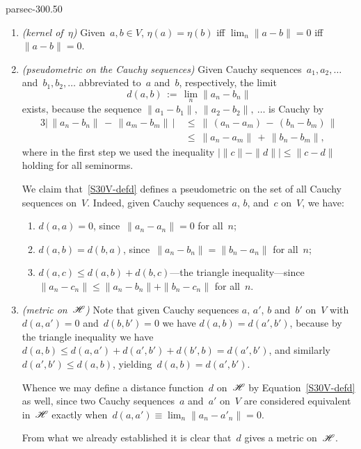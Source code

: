 \documentclass[b5page]{book}
\begin{document}
\begin{solution}{parsec-300.50}
\begin{enumerate}
\item
\emph{(kernel of~$\eta$)}
Given~$a,b\in V$,
 $\eta(a)=\eta(b)$
iff $\lim_n \|a-b\|=0$
iff $\|a-b\|=0$.
\item
\emph{(pseudometric on the Cauchy sequences)}
Given Cauchy sequences~$a_1,a_2,\dotsc$ and~$b_1,b_2,\dotsc$
abbreviated to~$a$ and~$b$, respectively,
the limit 
\begin{equation}
\label{S30V-defd}
\textstyle d(a,b)\,:=\,\lim_n \|a_n-b_n\|
\end{equation}
exists,
because the sequence  $\|a_1-b_1\|,\ \|a_2-b_2\|,\ \dotsc$
is Cauchy by
\begin{alignat*}{3}
\left|\,\|a_n-b_n\|\,-\,\|a_m-b_m\|\,\right|
\ &\leq\ 
\|\,(a_n-a_m)\,-\,(b_n-b_m)\,\|\\
\ &\leq\ \|a_n-a_m\|\,+\,\|b_n-b_m\|,
\end{alignat*}
where in the first step
we used the inequality  $\left|\|c\|-\|d\|\right|\leq \|c-d\|$
holding for all seminorms.

We claim that~\eqref{S30V-defd} defines
a pseudometric on the set of all Cauchy sequences on~$V$.
Indeed, given Cauchy sequences $a$, $b$, and~$c$ on~$V$,
we have:
\begin{enumerate}
\item
$d(a,a)=0$, since~$\|a_n-a_n\|=0$ for all~$n$;
\item
$d(a,b)=d(b,a)$, since~$\|a_n-b_n\|=\|b_n-a_n\|$
for all~$n$;
\item
$d(a,c)\leq d(a,b)+d(b,c)$---the triangle inequality---since
$\|a_n-c_n\|\leq \|a_n-b_n\|+\|b_n-c_n\|$
for all~$n$.
\end{enumerate}
\item\emph{(metric on~$\mathscr{H}$)}\label{S40Vmetric}
Note that given Cauchy sequences $a$, $a'$, $b$ and~$b'$ on~$V$
with $d(a,a')=0$ and~$d(b,b')=0$
we have $d(a,b)=d(a',b')$,
because by the triangle inequality
we have
$d(a,b) \leq d(a,a')+d(a',b')+d(b',b)
= d(a',b')$, and similarly $d(a',b')\leq d(a,b)$,
yielding~$d(a,b)=d(a',b')$.

Whence we may define a distance function~$d$ 
on~$\mathscr{H}$ by Equation~\eqref{S30V-defd} as well,
since two Cauchy sequences~$a$ and~$a'$
on~$V$ are considered equivalent in~$\mathscr{H}$
exactly when~$d(a,a')\equiv\lim_n\|a_n -a'_n\|=0$.

From what we already established it is clear that~$d$ gives a metric
on~$\mathscr{H}$.


\end{enumerate}
\end{solution}
\end{document}

